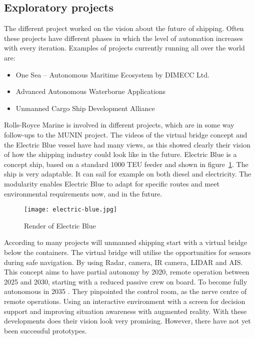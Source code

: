 \subsection{Exploratory projects}
The different project worked on the vision about the future of shipping. Often these projects have different phases in which the level of automation increases with every iteration. Examples of projects currently running all over the world are:
\begin{itemize}
	\item One Sea – Autonomous Maritime Ecosystem by DIMECC Ltd.
	\item Advanced Autonomous Waterborne Applications
	\item Unmanned Cargo Ship Development Alliance
\end{itemize}

Rolls-Royce Marine is involved in different projects, which are in some way follow-ups to the MUNIN project. The videos of the virtual bridge concept and the Electric Blue vessel have had many views, as this showed clearly their vision of how the shipping industry could look like in the future. Electric Blue is a concept ship, based on a standard 1000 TEU feeder and shown in figure~\ref{fig:electric-blue}. The ship is very adaptable. It can sail for example on both diesel and electricity. The modularity enables Electric Blue to adapt for specific routes and meet environmental requirements now, and in the future. 

\begin{figure}[p]
	\centering
	\texttt{[image: electric-blue.jpg]}
	\caption{Render of Electric Blue}
	\label{fig:electric-blue}
\end{figure}

According to many projects will unmanned shipping start with a virtual bridge below the containers. The virtual bridge will utilise the opportunities for sensors during safe navigation. By using Radar, camera, IR camera, LIDAR and \ac{AIS}. This concept aims to have partial autonomy by 2020, remote operation between 2025 and 2030, starting with a reduced passive crew on board. To become fully autonomous in 2035 \cite{Wilson2017}. 
They pinpointed the control room, as the nerve centre of remote operations. Using an interactive environment with a screen for decision support and improving situation awareness with augmented reality. With these developments does their vision look very promising. However, there have not yet been successful prototypes.

